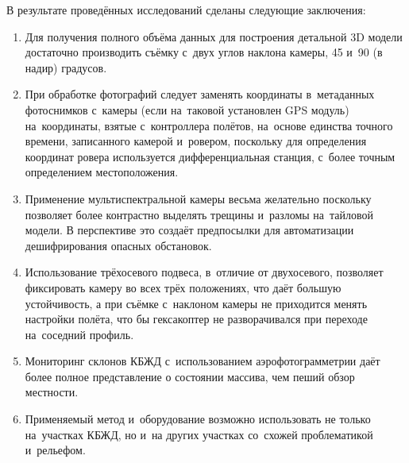 В результате проведённых исследований сделаны следующие заключения:
\begin{enumerate}[noitemsep]\vspace{-8pt}
\item Для получения полного объёма данных для построения детальной 3D модели достаточно производить съёмку с~двух углов наклона камеры, 45 и~90 (в надир) градусов.
\item При обработке фотографий следует заменять координаты в~метаданных фотоснимков с~камеры (если на~таковой установлен GPS модуль) на~координаты, взятые с~контроллера полётов, на~основе единства точного времени, записанного камерой и~ровером, поскольку для определения координат ровера используется дифференциальная станция, с~более точным определением местоположения.
\item Применение мультиспектральной камеры весьма желательно поскольку позволяет более контрастно выделять трещины и~разломы на~тайловой модели. В перспективе это создаёт предпосылки для автоматизации дешифрирования опасных обстановок.
\item Использование трёхосевого подвеса, в~отличие от двухосевого, позволяет фиксировать камеру во всех трёх положениях, что даёт большую устойчивость, а при съёмке с~наклоном камеры не приходится менять настройки полёта, что бы гексакоптер не разворачивался при переходе на~соседний профиль.
\item Мониторинг склонов КБЖД с~использованием аэрофотограмметрии даёт более полное представление о состоянии массива, чем пеший обзор местности.
\item Применяемый метод и~оборудование возможно использовать не только на~участках КБЖД, но и~на других участках со~схожей проблематикой и~рельефом.
\end{enumerate}
\vspace{-8pt}

